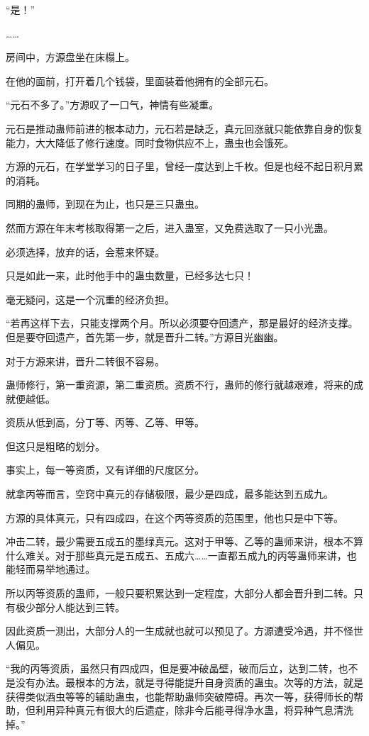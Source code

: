 \begin{this_body}
“是！”

……

房间中，方源盘坐在床榻上。

在他的面前，打开着几个钱袋，里面装着他拥有的全部元石。

“元石不多了。”方源叹了一口气，神情有些凝重。

元石是推动蛊师前进的根本动力，元石若是缺乏，真元回涨就只能依靠自身的恢复能力，大大降低了修行速度。同时食物供应不上，蛊虫也会饿死。

方源的元石，在学堂学习的日子里，曾经一度达到上千枚。但是也经不起日积月累的消耗。

同期的蛊师，到现在为止，也只是三只蛊虫。

然而方源在年末考核取得第一之后，进入蛊室，又免费选取了一只小光蛊。

必须选择，放弃的话，会惹来怀疑。

只是如此一来，此时他手中的蛊虫数量，已经多达七只！

毫无疑问，这是一个沉重的经济负担。

“若再这样下去，只能支撑两个月。所以必须要夺回遗产，那是最好的经济支撑。但是要夺回遗产，首先第一步，就是晋升二转。”方源目光幽幽。

对于方源来讲，晋升二转很不容易。

蛊师修行，第一重资源，第二重资质。资质不行，蛊师的修行就越艰难，将来的成就便越低。

资质从低到高，分丁等、丙等、乙等、甲等。

但这只是粗略的划分。

事实上，每一等资质，又有详细的尺度区分。

就拿丙等而言，空窍中真元的存储极限，最少是四成，最多能达到五成九。

方源的具体真元，只有四成四，在这个丙等资质的范围里，他也只是中下等。

冲击二转，最少需要五成五的墨绿真元。这对于甲等、乙等的蛊师来讲，根本不算什么难关。对于那些真元是五成五、五成六……一直都五成九的丙等蛊师来讲，也能轻而易举地通过。

所以丙等资质的蛊师，一般只要积累达到一定程度，大部分人都会晋升到二转。只有极少部分人能达到三转。

因此资质一测出，大部分人的一生成就也就可以预见了。方源遭受冷遇，并不怪世人偏见。

“我的丙等资质，虽然只有四成四，但是要冲破晶壁，破而后立，达到二转，也不是没有办法。最根本的方法，就是寻得能提升自身资质的蛊虫。次等的方法，就是获得类似酒虫等等的辅助蛊虫，也能帮助蛊师突破障碍。再次一等，获得师长的帮助，但利用异种真元有很大的后遗症，除非今后能寻得净水蛊，将异种气息清洗掉。”


\end{this_body}
